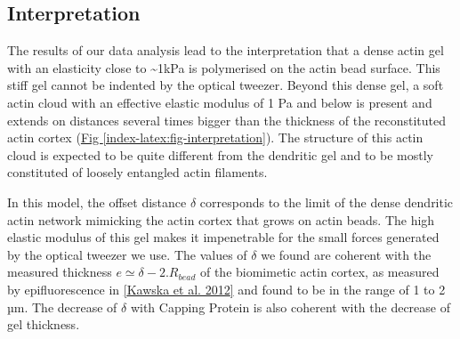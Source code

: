\documentclass[A4paperpaper,11pt,english]{sphinxmanual}
\begin{document}
\subsection{Interpretation}
\label{index-latex:interpretation}
The results of our data analysis lead to the interpretation that
a dense actin gel with an elasticity close to \textasciitilde{}1kPa is polymerised
on the actin bead surface. This stiff gel
cannot be indented by the optical tweezer. Beyond this dense gel, a soft
actin cloud with an effective elastic modulus of 1 Pa and below is
present and extends on distances several times bigger than the thickness
of the reconstituted actin cortex (\hyperref[index-latex:fig-interpretation]{Fig  \ref*{index-latex:fig-interpretation}}). The
structure of this actin cloud is expected to be quite different from the
dendritic gel and to be mostly constituted of loosely entangled actin filaments.

In this model, the offset distance \(\delta\) corresponds to the limit of the dense
dendritic actin network mimicking the actin cortex that grows on actin beads.
The high elastic modulus of this gel makes it impenetrable for the small forces generated by the optical tweezer we use. The
values of \(\delta\) we found are coherent with the measured thickness \(e
\simeq \delta - 2.R_{bead}\) of the  biomimetic actin cortex, as measured by
epifluorescence in {\hyperref[index-latex:kawska2012]{{[}Kawska et al. 2012{]}}} and found to be in the range of 1 to 2 µm. The decrease
of \(\delta\) with Capping Protein is also coherent with the decrease of gel
thickness.
\end{document}
